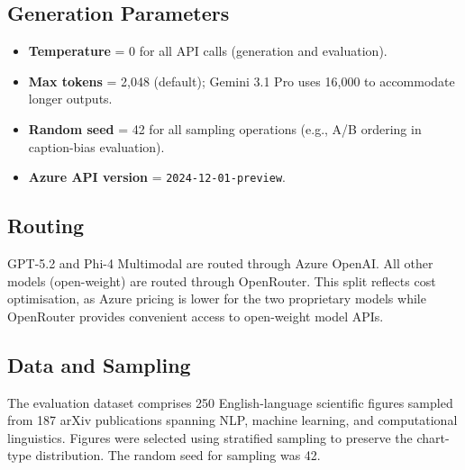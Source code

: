 \subsection{Generation Parameters}

\begin{itemize}[nosep]
  \item \textbf{Temperature} = 0 for all API calls (generation and evaluation).
  \item \textbf{Max tokens} = 2{,}048 (default); Gemini 3.1 Pro uses 16{,}000 to accommodate longer outputs.
  \item \textbf{Random seed} = 42 for all sampling operations (e.g., A/B ordering in caption-bias evaluation).
  \item \textbf{Azure API version} = \texttt{2024-12-01-preview}.
\end{itemize}

\subsection{Routing}

GPT-5.2 and Phi-4 Multimodal are routed through Azure OpenAI. All other models (open-weight) are routed through OpenRouter. This split reflects cost optimisation, as Azure pricing is lower for the two proprietary models while OpenRouter provides convenient access to open-weight model APIs.

\subsection{Data and Sampling}

The evaluation dataset comprises 250 English-language scientific figures sampled from 187 arXiv publications spanning NLP, machine learning, and computational linguistics. Figures were selected using stratified sampling to preserve the chart-type distribution. The random seed for sampling was 42.
